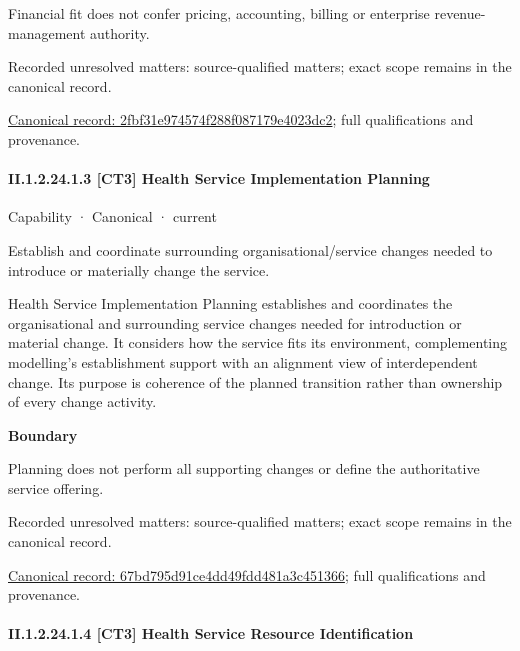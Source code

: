 Financial fit does not confer pricing, accounting, billing or enterprise revenue-management authority.


{\small Recorded unresolved matters: source-qualified matters; exact scope remains in the canonical record.}\par
{\footnotesize \href{../../../../continuum/strategy/capability/2fbf31e974574f288f087179e4023dc2.md}{Canonical record: 2fbf31e974574f288f087179e4023dc2}; full qualifications and provenance.}\par
\paragraph*{II.1.2.24.1.3 [CT3] Health Service Implementation Planning}
\label{navigation:II.1.2.24.1.3}

\label{element:67bd795d91ce4dd49fdd481a3c451366}
{\small Capability · Canonical · current}\par

Establish and coordinate surrounding organisational/service changes needed to introduce or materially change the service.



Health Service Implementation Planning establishes and coordinates the organisational and surrounding service changes needed for introduction or material change. It considers how the service fits its environment, complementing modelling's establishment support with an alignment view of interdependent change. Its purpose is coherence of the planned transition rather than ownership of every change activity.



\textbf{Boundary}



Planning does not perform all supporting changes or define the authoritative service offering.


{\small Recorded unresolved matters: source-qualified matters; exact scope remains in the canonical record.}\par
{\footnotesize \href{../../../../continuum/strategy/capability/67bd795d91ce4dd49fdd481a3c451366.md}{Canonical record: 67bd795d91ce4dd49fdd481a3c451366}; full qualifications and provenance.}\par
\paragraph*{II.1.2.24.1.4 [CT3] Health Service Resource Identification}
\label{navigation:II.1.2.24.1.4}

